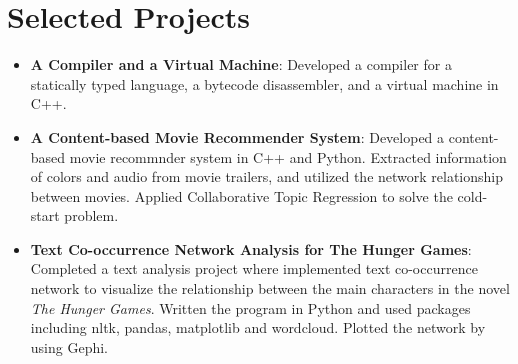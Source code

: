 \documentclass[letterpaper,11pt]{article}
\newcommand{\resumeItem}[2]{
  \item\small{
    \textbf{#1}{: #2 \vspace{-2pt}}
  }
}
\newcommand{\resumeSubItem}[2]{\resumeItem{#1}{#2}\vspace{-4pt}}
\newcommand{\resumeSubHeadingListStart}{\begin{itemize}[leftmargin=*]}
\newcommand{\resumeSubHeadingListEnd}{\end{itemize}}
\begin{document}
\section{Selected Projects}
  \resumeSubHeadingListStart
    \resumeSubItem{A Compiler and a Virtual Machine}
    {
        Developed a compiler for a statically typed language, a bytecode disassembler, and a virtual machine in C++.
    }
    \resumeSubItem{A Content-based Movie Recommender System}
    {
        Developed a content-based movie recommnder system in C++ and Python. Extracted information of colors and audio from movie trailers, and utilized the network relationship between movies. Applied Collaborative Topic Regression to solve the cold-start problem.
    }
    \resumeSubItem{Text Co-occurrence Network Analysis for The Hunger Games}
    {
	    Completed a text analysis project where implemented text co-occurrence network to visualize the relationship between the main characters in the novel \textit{The Hunger Games}. Written the program in Python and used packages including nltk, pandas, matplotlib and wordcloud. Plotted the network by using Gephi.
    }
  \resumeSubHeadingListEnd


\end{document}
